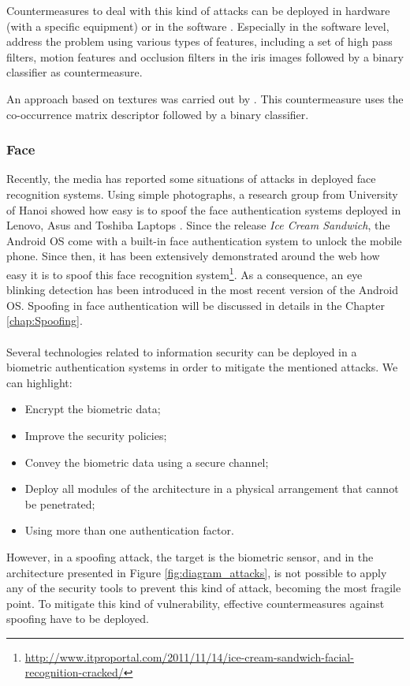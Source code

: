 Countermeasures to deal with this kind of attacks can be deployed in hardware (with a specific equipment) or in the software \cite{Galbally_ICB-2012}. Especially in the software level, \cite{Galbally_ICB-2012} address the problem using various types of features, including a set of  high pass filters, motion features and occlusion filters in the iris images followed by a binary classifier as countermeasure. 

An approach based on textures was carried out by \cite{ZhuoshiWei}. This countermeasure uses the co-occurrence matrix descriptor followed by a binary classifier.


\subsubsection{Face}

Recently, the media has reported some situations of attacks in deployed face recognition systems. Using simple photographs, a research group from University of Hanoi showed how easy is to spoof the face authentication systems deployed in Lenovo, Asus and Toshiba Laptops \cite{BlackHat2009}. Since the release \textit{Ice Cream Sandwich}, the Android OS come with a built-in face authentication system to unlock the mobile phone. Since then, it has been extensively demonstrated around the web how easy it is to spoof this face recognition system\footnote{\url{http://www.itproportal.com/2011/11/14/ice-cream-sandwich-facial-recognition-cracked/}}. As a consequence, an eye blinking detection has been introduced in the most recent version of the Android OS. Spoofing in face authentication will be discussed in details in the Chapter \ref{chap:Spoofing}. \\ \\ 

Several technologies related to information security can be deployed in a biometric authentication systems in order to mitigate the mentioned attacks. We can highlight:
\begin{itemize}
        \item Encrypt the biometric data;
        \item Improve the security policies;
        \item Convey the biometric data using a secure channel;
        \item Deploy all modules of the architecture in a physical arrangement that cannot be penetrated;
        \item Using more than one authentication factor.
\end{itemize}
However, in a spoofing attack, the target is the biometric sensor, and in the architecture presented in Figure \ref{fig:diagram_attacks}, is not possible to apply any of the security tools to prevent this kind of attack, becoming the most fragile point. To mitigate this kind of vulnerability, effective countermeasures against spoofing have to be deployed.


